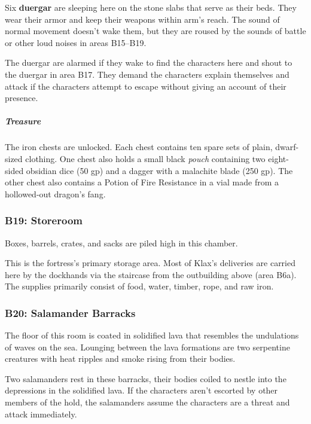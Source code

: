 \documentclass[10pt,a4paper,twoside,bg=print,twocolumn,openany,nodeprecatedcode]{dndbook}
\begin{document}
Six \textbf{duergar} are sleeping here on the stone slabs that serve as their beds. They wear their armor and keep their weapons within arm's reach. The sound of normal movement doesn't wake them, but they are roused by the sounds of battle or other loud noises in areas B15–B19.

The duergar are alarmed if they wake to find the characters here and shout to the duergar in area B17. They demand the characters explain themselves and attack if the characters attempt to escape without giving an account of their presence.

\subparagraph{Treasure}
The iron chests are unlocked. Each chest contains ten spare sets of plain, dwarf-sized clothing. One chest also holds a small black \textit{pouch} containing two eight-sided obsidian dice (50 gp) and a dagger with a malachite blade (250 gp). The other chest also contains a Potion of Fire Resistance in a vial made from a hollowed-out dragon's fang.

\subsubsection{B19: Storeroom}
\begin{DndReadAloud}{}
Boxes, barrels, crates, and sacks are piled high in this chamber.

\end{DndReadAloud}

This is the fortress's primary storage area. Most of Klax's deliveries are carried here by the dockhands via the staircase from the outbuilding above (area B6a). The supplies primarily consist of food, water, timber, rope, and raw iron.

\subsubsection{B20: Salamander Barracks}
\begin{DndReadAloud}{}
The floor of this room is coated in solidified lava that resembles the undulations of waves on the sea. Lounging between the lava formations are two serpentine creatures with heat ripples and smoke rising from their bodies.

\end{DndReadAloud}

Two salamanders rest in these barracks, their bodies coiled to nestle into the depressions in the solidified lava. If the characters aren't escorted by other members of the hold, the salamanders assume the characters are a threat and attack immediately.
\end{document}

